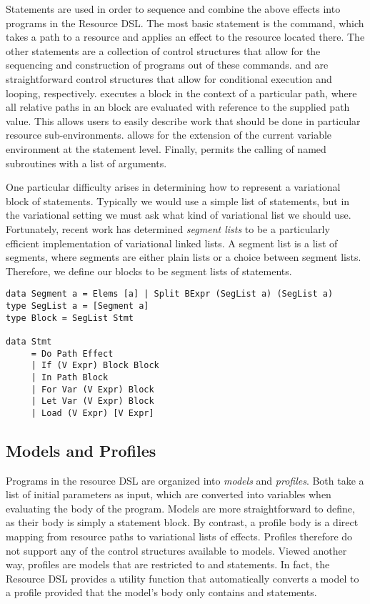 \documentclass[12pt,oneside]{book}
\begin{document}
Statements are used in order to sequence and combine the above effects into programs in the Resource DSL.
The most basic statement is the  command, which takes a path to a resource and applies an effect to the resource located there.
The other statements are a collection of control structures that allow for the sequencing and construction of
programs out of these  commands.  and  are straightforward control structures that allow
for conditional execution and looping, respectively.  executes a block in the context of a particular path, where all
relative paths in an  block are evaluated with reference to the supplied path value. This allows
users to easily describe work that should be done in particular resource sub-environments.  allows for the
extension of the current variable environment at the statement level. Finally,  permits the calling of named
subroutines with a list of arguments. 

One particular difficulty arises in determining how to represent a variational block of statements. Typically we
would use a simple list of statements, but in the variational setting we must ask what kind of variational list
we should use. Fortunately, recent work \cite{lists} has determined \emph{segment lists} to be a particularly
efficient implementation of variational linked lists. A segment list is a list of segments, where segments are either
plain lists or a choice between segment lists. Therefore, we define our blocks to be segment lists of
statements.

\begin{minipage}{\linewidth}
\begin{lstlisting}
data Segment a = Elems [a] | Split BExpr (SegList a) (SegList a)
type SegList a = [Segment a]
type Block = SegList Stmt

data Stmt
     = Do Path Effect
     | If (V Expr) Block Block
     | In Path Block
     | For Var (V Expr) Block
     | Let Var (V Expr) Block
     | Load (V Expr) [V Expr]
\end{lstlisting}
\end{minipage}

\subsection{Models and Profiles}

Programs in the resource DSL are organized into \emph{models} and \emph{profiles}. Both take a list of
initial parameters as input, which are converted into variables when evaluating the body of the program. Models are more straightforward to define,
as their body is simply a statement block. By contrast, a profile body is a direct mapping from resource paths to variational lists of effects. Profiles
therefore do not support any of the control structures available to models. Viewed another way, profiles are models that are restricted to 
and  statements. In fact, the Resource DSL provides a utility function  that automatically converts a model to a profile provided
that the model's body only contains  and  statements.
\end{document}
